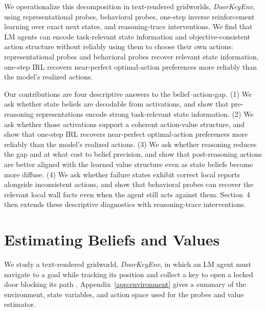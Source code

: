 \documentclass[10pt,twocolumn]{article}
\begin{document}
We operationalize this decomposition in text-rendered gridworlds, \textit{DoorKeyEnv}, using representational probes, behavioral probes, one-step inverse reinforcement learning over exact next states, and reasoning-trace interventions.
We find that LM agents can encode task-relevant state information and
objective-consistent action structure without reliably using them to choose their own actions: representational probes and behavioral probes recover relevant state information, one-step IRL recovers near-perfect optimal-action preferences more reliably than the model's realized actions. %

Our contributions are four descriptive answers to the belief--action-gap. (1) We ask whether state beliefs are decodable from activations, and
show that pre-reasoning representations encode strong task-relevant state information. (2) We ask whether those activations support a coherent action-value structure, and show that one-step IRL recovers near-perfect optimal-action preferences more reliably than the model's realized actions. (3) We ask whether reasoning reduces the gap and at what cost to belief precision, and show that post-reasoning actions are better aligned with the learned value structure even as state beliefs become more diffuse. (4) We ask whether failure states exhibit correct local reports alongside inconsistent actions, and show that behavioral probes can recover the relevant local wall
facts even when the agent still acts against them. Section~4 then extends these descriptive diagnostics with reasoning-trace interventions.


\section{Estimating Beliefs and Values}
We study a text-rendered gridworld, \textit{DoorKeyEnv}, in which an LM agent must navigate to a goal while tracking its position and collect a key to open a locked door blocking its path \cite{arghal2026behavioural}.
Appendix~\ref{app:environment} gives a summary
of the environment, state variables, and action space used for the probes and value estimator.
\end{document}
